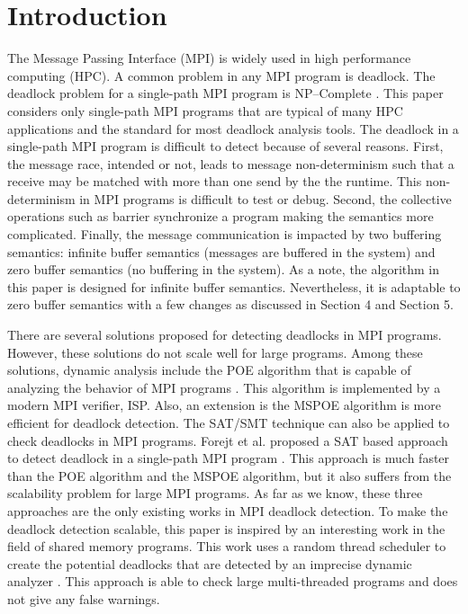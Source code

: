 \section{Introduction}

The Message Passing Interface (MPI) is widely used in high performance computing (HPC). A common problem in any MPI program is deadlock. The deadlock problem for a single-path MPI program is NP--Complete \cite{DBLP:conf/fm/ForejtKNS14}.
This paper considers only single-path MPI programs that are typical of many HPC applications and the standard for most deadlock analysis tools.  
The deadlock in a single-path MPI program is difficult to detect because of several reasons. First, the message race, intended or not, leads to message non-determinism such that a receive may be matched with more than one send by the the runtime. This non-determinism in MPI programs is difficult to test or debug. Second, the collective operations such as barrier synchronize a program making the semantics more complicated. Finally, the message communication is impacted by two buffering semantics: infinite buffer semantics (messages are buffered in the system) and zero buffer semantics (no buffering in the system). As a note, the algorithm in this paper is designed for infinite buffer semantics. Nevertheless, it is adaptable to zero buffer semantics with a few changes as discussed in Section 4 and Section 5.

There are several solutions proposed for detecting deadlocks in MPI programs. However, these solutions do not scale well for large programs. Among these solutions, dynamic analysis include the POE algorithm that is capable of analyzing the behavior of MPI programs \cite{DBLP:conf/ppopp/VakkalankaSGK08}. This algorithm is implemented by a modern MPI verifier, ISP. Also, an extension is the MSPOE algorithm is more efficient for deadlock detection\cite{DBLP:conf/sbmf/SharmaGB12}. 
The SAT/SMT technique can also be applied to check deadlocks in MPI programs. 
Forejt et al. proposed a SAT based approach to detect deadlock in a single-path MPI program \cite{DBLP:conf/fm/ForejtKNS14}. This approach is much faster than the POE algorithm and the MSPOE algorithm, but it also suffers from the scalability problem for large MPI programs. 
As far as we know, these three approaches are the only existing works in MPI deadlock detection. 
To make the deadlock detection scalable, this paper is inspired by an interesting work in the field of shared memory programs.
This work uses a random thread scheduler to create the potential deadlocks that are detected by an imprecise dynamic analyzer \cite{DBLP:conf/pldi/JoshiPSN09}. This approach is able to check large multi-threaded programs and does not give any false warnings. 

